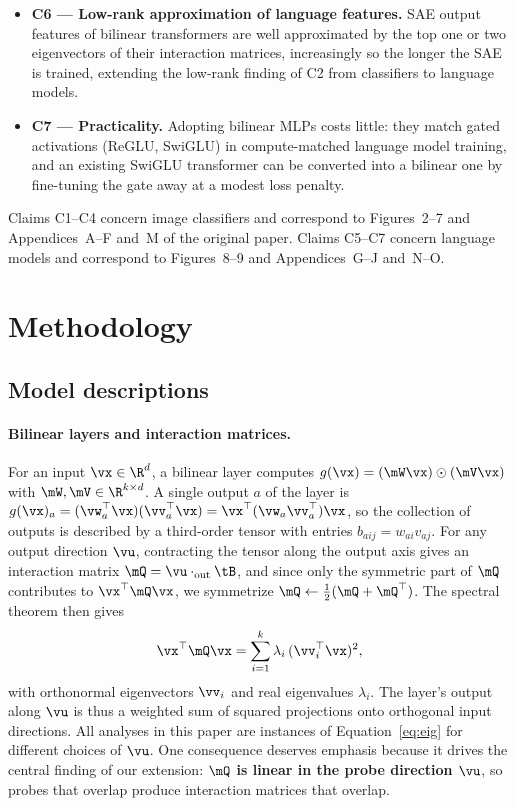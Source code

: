 \documentclass[10pt]{article} %
\begin{document}
\begin{itemize}
\item \textbf{C6 --- Low-rank approximation of language features.} SAE output features
of bilinear transformers are well approximated by the top one or two eigenvectors of
their interaction matrices, increasingly so the longer the SAE is trained, extending
the low-rank finding of C2 from classifiers to language models.

\item \textbf{C7 --- Practicality.} Adopting bilinear MLPs costs little: they match
gated activations (ReGLU, SwiGLU) in compute-matched language model training, and an
existing SwiGLU transformer can be converted into a bilinear one by fine-tuning the
gate away at a modest loss penalty.
\end{itemize}

Claims C1--C4 concern image classifiers and correspond to Figures~2--7 and
Appendices~A--F and~M of the original paper. Claims C5--C7 concern language models and
correspond to Figures~8--9 and Appendices~G--J and~N--O.

\section{Methodology}
\label{sec:method}

\subsection{Model descriptions}
\label{sec:models}

\paragraph{Bilinear layers and interaction matrices.}
For an input $\vx \in \R^d$, a bilinear layer computes
$g(\vx) = (\mW\vx) \odot (\mV\vx)$ with $\mW, \mV \in \R^{k \times d}$. A single
output $a$ of the layer is $g(\vx)_a = (\vw_{a}^\top \vx)(\vv_{a}^\top \vx) =
\vx^\top (\vw_a \vv_a^\top) \vx$, so the collection of outputs is described by a
third-order tensor with entries $b_{aij} = w_{ai} v_{aj}$. For any output direction
$\vu$, contracting the tensor along the output axis gives an interaction matrix
$\mQ = \vu \cdot_{\text{out}} \tB$, and since only the symmetric part of $\mQ$
contributes to $\vx^\top \mQ \vx$, we symmetrize
$\mQ \leftarrow \tfrac{1}{2}(\mQ + \mQ^\top)$. The spectral theorem then gives
\begin{equation}
  \vx^\top \mQ \vx = \sum_{i=1}^{k} \lambda_i \, (\vv_i^\top \vx)^2,
  \label{eq:eig}
\end{equation}
with orthonormal eigenvectors $\vv_i$ and real eigenvalues $\lambda_i$. The layer's
output along $\vu$ is thus a weighted sum of squared projections onto orthogonal
input directions. All analyses in this paper are instances of
Equation~\ref{eq:eig} for different choices of $\vu$. One consequence deserves
emphasis because it drives the central finding of our extension: \textbf{$\mQ$ is
linear in the probe direction $\vu$}, so probes that overlap produce interaction
matrices that overlap.
\end{document}
